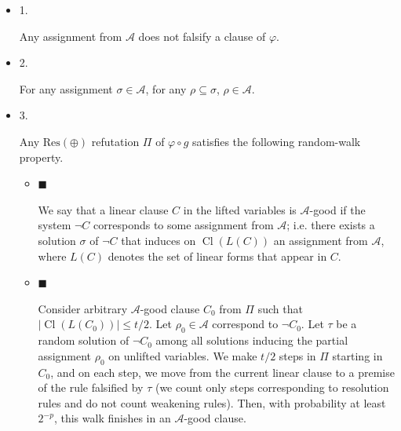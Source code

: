 \documentclass[10pt,a4paper]{article}
\begin{document}
\begin{itemize}


\item 
1. 


Any assignment from $\mathcal{A}$ does not falsify a clause of $\varphi$.\par





\item 
2. 


For any assignment $\sigma\in\mathcal{A}$, for any $\rho\subseteq\sigma$, $\rho\in\mathcal{A}$.\par





\item 
3. 


Any $\mathrm{Res}(\oplus)$ refutation $\Pi$ of $\varphi\circ g$ satisfies the following random-walk property.\par


\begin{itemize}


\item 
$\blacksquare$ 


We say that a linear clause $C$ in the lifted variables is $\mathcal{A}$-good if the system $\lnot C$ corresponds to some assignment from $\mathcal{A}$; i.e. there exists a solution $\sigma$ of $\lnot C$ that induces on $\mathop{\mathrm{Cl}}(L(C))$ an assignment from $\mathcal{A}$, where $L(C)$ denotes the set of linear forms that appear in $C$.\par





\item 
$\blacksquare$ 


Consider arbitrary $\mathcal{A}$-good clause $C_{0}$ from $\Pi$ such that $|\mathop{\mathrm{Cl}}(L(C_{0}))|\leq t/2$. Let $\rho_{0}\in\mathcal{A}$ correspond to $\lnot C_{0}$. Let $\tau$ be a random solution of $\lnot C_{0}$ among all solutions inducing the partial assignment $\rho_{0}$ on unlifted variables. We make $t/2$ steps in $\Pi$ starting in $C_{0}$, and on each step, we move from the current linear clause to a premise of the rule falsified by $\tau$ (we count only steps corresponding to resolution rules and do not count weakening rules). Then, with probability at least $2^{-p}$, this walk finishes in an $\mathcal{A}$-good clause.\par





\end{itemize}





\end{itemize}
\end{document}
